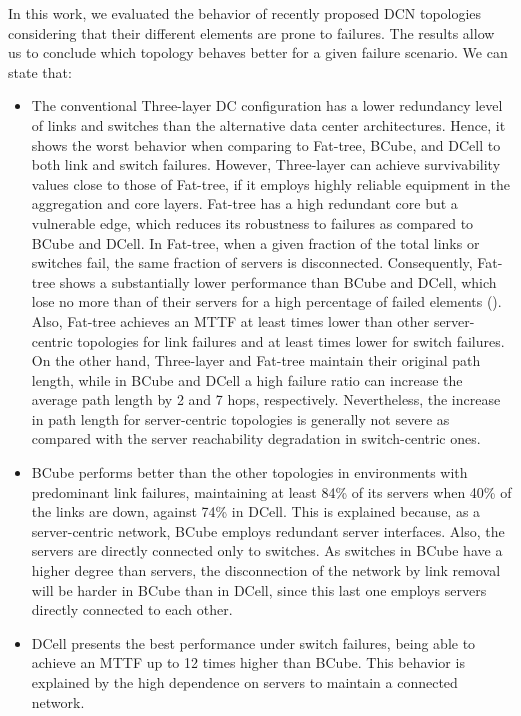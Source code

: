 In this work, we evaluated the behavior of recently proposed DCN topologies considering that their different elements are prone to failures. The results allow us to conclude which topology behaves better for a given failure scenario. We can state that:
\begin{itemize}
\item The conventional Three-layer DC configuration has a lower redundancy level of links and switches than the alternative data center architectures. Hence, it shows the worst behavior when comparing to Fat-tree, BCube, and DCell to both link and switch failures. However, Three-layer can achieve survivability values close to those of Fat-tree, if it employs highly reliable equipment in the aggregation and core layers.
Fat-tree has a high redundant core but a vulnerable edge, which reduces its robustness to failures as compared to BCube and DCell. In Fat-tree, when a given fraction of the total links or switches fail, the same fraction of servers is disconnected. Consequently, Fat-tree shows a substantially lower performance than BCube and DCell, which lose no more than  of their servers for a high percentage of failed elements (). Also, Fat-tree achieves an MTTF at least  times lower than other server-centric topologies for link failures and at least  times lower for switch failures. On the other hand, Three-layer and Fat-tree maintain their original path length, while in BCube and DCell a high failure ratio can increase the average path length by 2 and 7 hops, respectively. Nevertheless, the increase in path length for server-centric topologies is generally not severe as compared with the server reachability degradation in switch-centric ones.
\item BCube performs better than the other topologies in environments with predominant link failures, maintaining at least 84\% of its servers when 40\% of the links are down, against 74\% in DCell. This is explained because, as a server-centric network, BCube employs redundant server interfaces. Also, the servers are directly connected only to switches. As switches in BCube have a higher degree than servers, the disconnection of the network by link removal will be harder in BCube than in DCell, since this last one employs servers directly connected to each other.
\item DCell presents the best performance under switch failures, being able to achieve an MTTF up to 12 times higher than BCube. This behavior is explained by the high dependence on servers to maintain a connected network.
\end{itemize}
 
